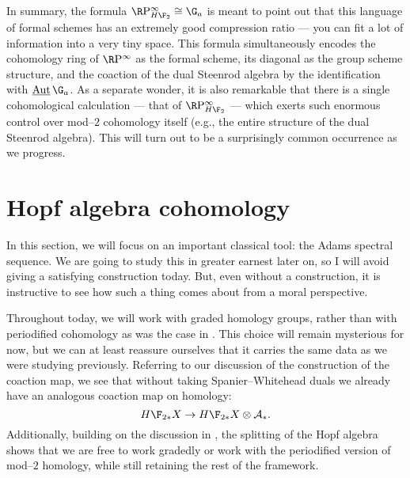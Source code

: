 In summary, the formula $\RP^\infty_{H\F_2} \cong \G_a$ is meant to point out that this language of formal schemes has an extremely good compression ratio --- you can fit a lot of information into a very tiny space.  This formula simultaneously encodes the cohomology ring of $\RP^\infty$ as the formal scheme, its diagonal as the group scheme structure, and the coaction of the dual Steenrod algebra by the identification with $\InternalAut{\G_a}$.  As a separate wonder, it is also remarkable that there is a single cohomological calculation --- that of $\RP^\infty_{H\F_2}$ --- which exerts such enormous control over mod--$2$ cohomology itself (e.g., the entire structure of the dual Steenrod algebra).  This will turn out to be a surprisingly common occurrence as we progress.








\section{Hopf algebra cohomology}\label{HopfAlgebraLecture}

In this section, we will focus on an important classical tool: the Adams spectral sequence.  We are going to study this in greater earnest later on, so I will avoid giving a satisfying construction today.  But, even without a construction, it is instructive to see how such a thing comes about from a moral perspective.  

\begin{remark}
Throughout today, we will work with graded homology groups, rather than with periodified cohomology as was the case in .  This choice will remain mysterious for now, but we can at least reassure ourselves that it carries the same data as we were studying previously.  Referring to our discussion of the construction of the coaction map, we see that without taking Spanier--Whitehead duals we already have an analogous coaction map on homology: \[H\F_{2*} X \to H\F_{2*} X \otimes \mathcal A_*.\]  Additionally, building on the discussion in , the splitting of the Hopf algebra shows that we are free to work gradedly or work with the periodified version of mod--$2$ homology, while still retaining the rest of the framework.
\end{remark}

